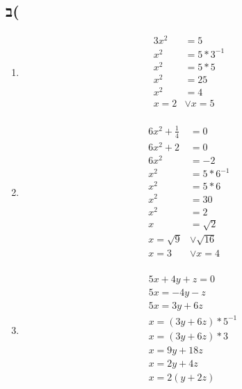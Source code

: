 \documentclass{article}
\begin{document}
\subsection{ב(}
\begin{enumerate}
 
\item 
\begin{align*}
  3x^{2} &= 5  \\
  x^{2} &= 5 * 3^{-1}\\
  x^{2} &= 5 * 5\\
  x^{2} &= 25\\
  x^{2} &= 4\\
  x = 2 &\lor x = 5\\
\end{align*}

\clearpage
\item 
\begin{align*}
  6x^{2} + \frac{1}{4} &= 0\\ 
  6x^{2} + 2 &= 0\\ 
  6x^{2} &= -2\\ 
  x^{2} &= 5 * 6^{-1}\\ 
  x^{2} &= 5 * 6\\ 
  x^{2} &= 30\\ 
  x^{2} &= 2\\ 
  x &=  \sqrt{2} \\ 
  x = \sqrt{9} &\lor \sqrt{16} \\ 
  x =  3 &\lor x = 4\\ 
\end{align*}

\item 
\begin{align*}
  &5x+4y+z = 0\\ 
  &5x = -4y - z\\ 
  &5x = 3y + 6z\\ 
  &x = (3y + 6z)*5^{-1}\\ 
  &x = (3y + 6z)*3\\ 
  &x = 9y + 18z\\ 
  &x = 2y + 4z\\ 
  &x = 2(y + 2z)\\ 
\end{align*}

\end{enumerate}
\end{document}
